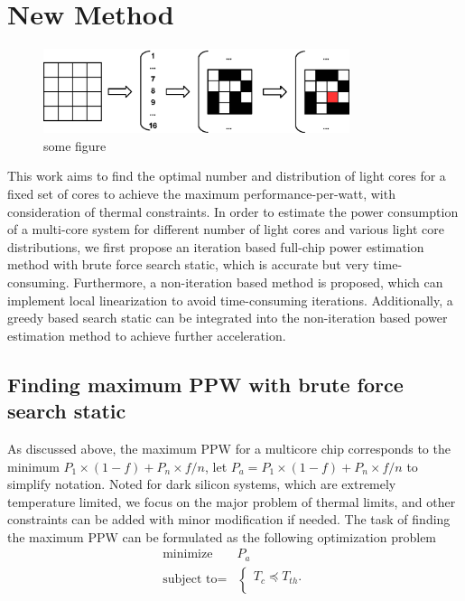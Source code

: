 \section{New Method}


\begin{figure}[htb]
\centering
\includegraphics[width=0.8\textwidth]{fig/brute_force.eps}
\caption{some figure}
\end{figure}


This work aims to find the optimal number and distribution of light cores for a fixed set of cores to achieve the maximum performance-per-watt, with consideration of thermal constraints. In order to estimate the power consumption of a multi-core system for different number of light cores and various light core distributions, we first propose an iteration based full-chip power estimation method with brute force search static, which is accurate but very time-consuming. Furthermore, a non-iteration based method is proposed, which can implement local linearization to avoid time-consuming iterations. Additionally, a greedy based search static can be integrated into the non-iteration based power estimation method to achieve further acceleration.

\subsection{Finding maximum PPW with brute force search static}
As discussed above, the maximum PPW for a multicore chip corresponds to the minimum $P_{1} \times (1-f)+P_{n} \times f/n$, let $P_{a} = P_{1} \times (1-f)+P_{n} \times f/n$ to simplify notation. Noted for dark silicon systems, which are extremely temperature limited, we focus on the major problem of thermal limits, and other constraints can be added with minor modification if needed. The task of finding the maximum PPW can be formulated as the following optimization problem
\begin{equation}
\begin{split}
\text{minimize } & P_{a}\\
\text{subject to} = &\left\{
\begin{array}{c}
T_{c} \preceq T_{th}.\\
\end{array}
\right.
\end{split}
\end{equation}

